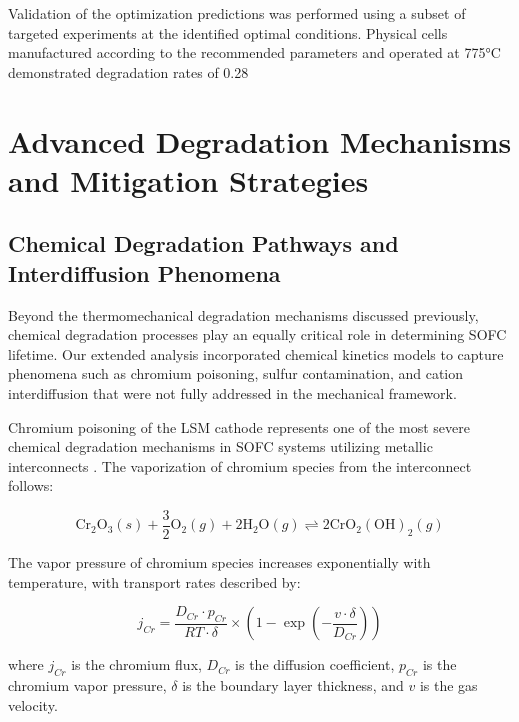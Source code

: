 \documentclass[conference]{IEEEtran}
\begin{document}
Validation of the optimization predictions was performed using a subset of targeted experiments at the identified optimal conditions. Physical cells manufactured according to the recommended parameters and operated at 775°C demonstrated degradation rates of 0.28%

\section{Advanced Degradation Mechanisms and Mitigation Strategies}

\subsection{Chemical Degradation Pathways and Interdiffusion Phenomena}

Beyond the thermomechanical degradation mechanisms discussed previously, chemical degradation processes play an equally critical role in determining SOFC lifetime. Our extended analysis incorporated chemical kinetics models to capture phenomena such as chromium poisoning, sulfur contamination, and cation interdiffusion that were not fully addressed in the mechanical framework.

Chromium poisoning of the LSM cathode represents one of the most severe chemical degradation mechanisms in SOFC systems utilizing metallic interconnects \cite{wang2024chromium}. The vaporization of chromium species from the interconnect follows:

\begin{equation}
\text{Cr}_2\text{O}_3(s) + \frac{3}{2}\text{O}_2(g) + 2\text{H}_2\text{O}(g) \rightleftharpoons 2\text{CrO}_2(\text{OH})_2(g)
\end{equation}

The vapor pressure of chromium species increases exponentially with temperature, with transport rates described by:

\begin{equation}
j_{Cr} = \frac{D_{Cr} \cdot p_{Cr}}{RT \cdot \delta} \times \left(1 - \exp\left(-\frac{v \cdot \delta}{D_{Cr}}\right)\right)
\end{equation}

where $j_{Cr}$ is the chromium flux, $D_{Cr}$ is the diffusion coefficient, $p_{Cr}$ is the chromium vapor pressure, $\delta$ is the boundary layer thickness, and $v$ is the gas velocity.
\end{document}
